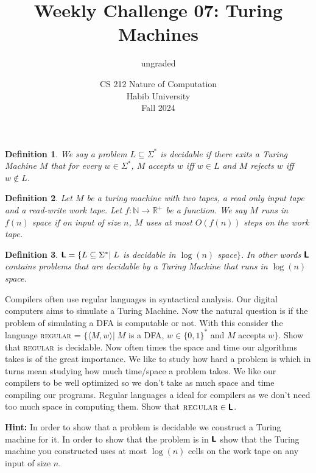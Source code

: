 \documentclass[a4paper]{exam}
\title{Weekly Challenge 07: Turing Machines}
\author{ungraded} %
\date{CS 212 Nature of Computation\\Habib University\\Fall 2024}
\newcommand{\classX}[1]{\ensuremath{\text{\textsf{\textbf{#1}}}}}
\newcommand{\classL}{\classX{L}}
\newtheorem{definition}{Definition}
\begin{document}
\maketitle

\begin{questions}
  
\titledquestion{}
    \begin{definition}
        We say a problem $L \subseteq \Sigma^*$ is decidable if there exits a Turing Machine $M$ that for every $w \in \Sigma^*$, $M$ \emph{accepts} $w$ iff $w \in L$ and $M$ \emph{rejects} $w$ iff $w \not\in L$.
    \end{definition}
    \begin{definition}
        Let $M$ be a turing machine with two tapes, a read only input tape and a read-write work tape. Let $f: \mathbb{N} \to \mathbb{R}^+$ be a function. We say $M$ runs in $f(n)$ space if on input of size $n$, $M$ uses at most $O(f(n))$ steps on the work tape.
    \end{definition}
    \begin{definition}
        $\classL = \{L \subseteq \Sigma^* |\; L$ is decidable in $\log(n)$ space$\}$. In other words $\classL$ contains problems that are decidable by a Turing Machine that runs in $\log(n)$ space.
    \end{definition}
    Compilers often use regular languages in syntactical analysis. Our digital computers aims to simulate a Turing Machine. Now the natural question is if the problem of simulating a DFA is computable or not.
    With this consider the language \textsc{regular} = $\{\langle M, w\rangle |\;M$ is a DFA, $w \in \{0,1\}^*$ and $M$ accepts $w \}$. 
    Show that \textsc{regular} is decidable.
    Now often times the space and time our algorithms takes is of the great importance. We like to study how hard a problem is which in turns mean studying how much time/space a problem takes. We like our compilers to be well optimized so we don't take as much space and time compiling our programs. Regular languages a ideal for compilers as we don't need too much space in computing them. Show that $\textsc{regular} \in \classL$. 
    
    \textbf{Hint:} In order to show that a problem is decidable we construct a Turing machine for it. In order to show that the problem is in $\classL$ show that the Turing machine you constructed uses at most $\log(n)$ cells on the work tape on any input of size $n$.
  
  \begin{solution}
  \end{solution}
\end{questions}
\end{document}
